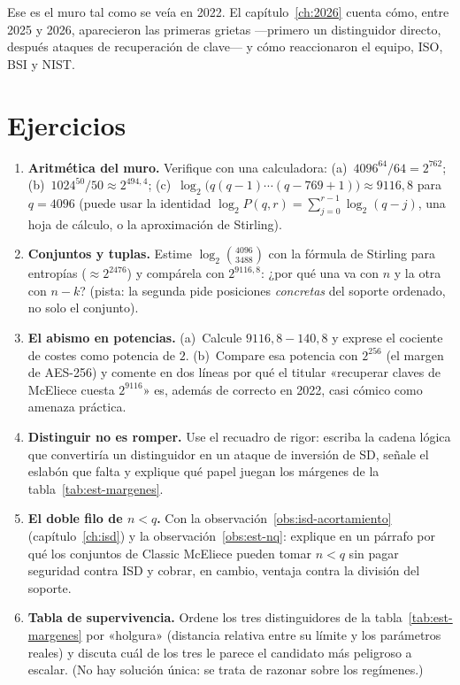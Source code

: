 Ese es el muro tal como se veía en 2022. El capítulo~\ref{ch:2026}
cuenta cómo, entre 2025 y 2026, aparecieron las primeras grietas
---primero un distinguidor directo, después ataques de recuperación
de clave--- y cómo reaccionaron el equipo, ISO, BSI y NIST.

\section{Ejercicios}

\begin{enumerate}[leftmargin=1.6em,itemsep=4pt]
  \item \textbf{Aritmética del muro.} Verifique con una calculadora:
        (a)~$4096^{64}/64 = 2^{762}$; (b)~$1024^{50}/50 \approx
        2^{494{,}4}$; (c)~$\log_2\bigl(q(q-1)\cdots(q-769+1)\bigr)
        \approx 9116{,}8$ para $q=4096$ (puede usar la identidad
        $\log_2 P(q,r) = \sum_{j=0}^{r-1}\log_2(q-j)$, una hoja de
        cálculo, o la aproximación de Stirling).
  \item \textbf{Conjuntos y tuplas.} Estime $\log_2\binom{4096}{3488}$
        con la fórmula de Stirling para entropías
        ($\approx 2^{2476}$) y compárela con $2^{9116{,}8}$: ¿por qué
        una va con $n$ y la otra con $n-k$? (pista: la segunda pide
        posiciones \emph{concretas} del soporte ordenado, no solo el
        conjunto).
  \item \textbf{El abismo en potencias.} (a)~Calcule
        $9116{,}8-140{,}8$ y exprese el cociente de costes como
        potencia de $2$. (b)~Compare esa potencia con $2^{256}$
        (el margen de AES-256) y comente en dos líneas por qué el
        titular «recuperar claves de McEliece cuesta $2^{9116}$»
        es, además de correcto en 2022, casi cómico como amenaza
        práctica.
  \item \textbf{Distinguir no es romper.} Use el
        recuadro de rigor: escriba la cadena lógica que convertiría
        un distinguidor en un ataque de inversión de SD, señale el
        eslabón que falta y explique qué papel juegan los márgenes
        de la tabla~\ref{tab:est-margenes}.
  \item \textbf{El doble filo de $n<q$.} Con la
        observación~\ref{obs:isd-acortamiento} (capítulo~\ref{ch:isd})
        y la observación~\ref{obs:est-nq}: explique en un párrafo por
        qué los conjuntos de Classic McEliece pueden tomar $n<q$ sin
        pagar seguridad contra ISD y cobrar, en cambio, ventaja
        contra la división del soporte.
  \item \textbf{Tabla de supervivencia.} Ordene los tres
        distinguidores de la tabla~\ref{tab:est-margenes} por
        «holgura» (distancia relativa entre su límite y los
        parámetros reales) y discuta cuál de los tres le parece el
        candidato más peligroso a escalar. (No hay solución única:
        se trata de razonar sobre los regímenes.)
\end{enumerate}
